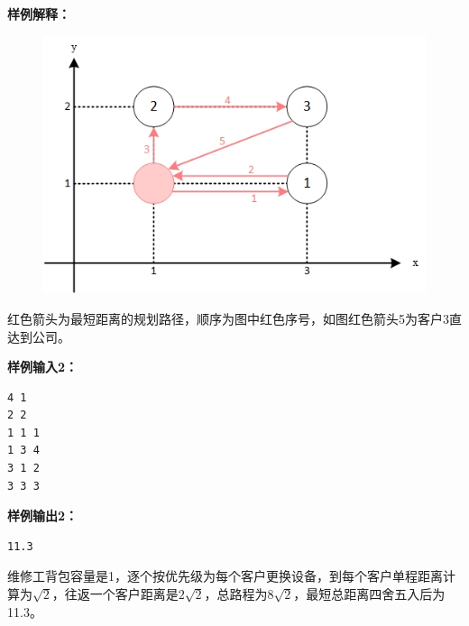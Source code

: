 \documentclass[a4paper]{ctexart}
\begin{document}
\noindent\textbf{样例解释：}
\begin{figure}[htbp]
	\centering
	\includegraphics[width=0.5\linewidth]{picture/huawei_0904_3_1_output_interpretation}
	\captionsetup{font=scriptsize}
\end{figure}
红色箭头为最短距离的规划路径，顺序为图中红色序号，如图红色箭头5为客户3直达到公司。

\noindent\textbf{样例输入2：}

\lstset{numbers=none}
\begin{lstlisting}
4 1
2 2
1 1 1
1 3 4
3 1 2
3 3 3
\end{lstlisting}
\lstset{numbers=left}

\noindent\textbf{样例输出2：}
\lstset{numbers=none}
\begin{lstlisting}
11.3
\end{lstlisting}
\lstset{numbers=left}
维修工背包容量是1，逐个按优先级为每个客户更换设备，到每个客户单程距离计算为$\sqrt{2}$，往返一个客户距离是$2\sqrt{2}$，总路程为$8\sqrt{2}$，最短总距离四舍五入后为11.3。
	
\vspace{10pt}
	
\end{document}

